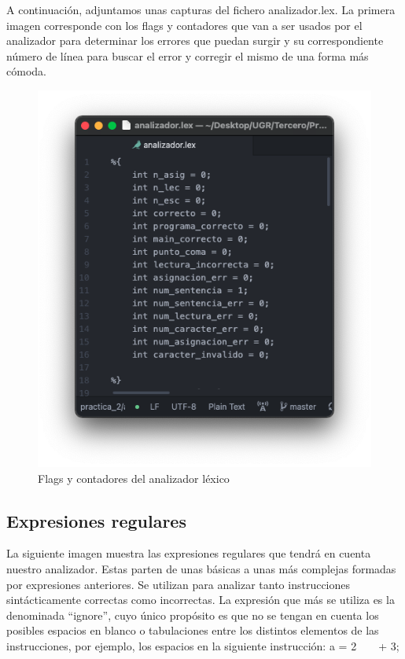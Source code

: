 A continuación, adjuntamos unas capturas del fichero analizador.lex. La primera imagen corresponde con los flags y contadores que van a ser usados por el analizador para determinar los errores que puedan 
surgir y su correspondiente número de línea para buscar el error y corregir el mismo de una forma más cómoda. 

\begin{figure}[H] 
	\centering
	\includegraphics[scale=0.5]{../practica_2/images/variables.png} 
	\caption{Flags y contadores del analizador léxico} 
    \label{fig:variables}
\end{figure}

\subsection{Expresiones regulares}

La siguiente imagen muestra las expresiones regulares que tendrá en cuenta nuestro analizador. Estas parten de unas básicas a unas más complejas formadas por expresiones anteriores. Se utilizan
para analizar tanto instrucciones sintácticamente correctas como incorrectas. La expresión que más se utiliza es la denominada ``ignore'', cuyo único propósito es que no se tengan en cuenta
los posibles espacios en blanco o tabulaciones entre los distintos elementos de las instrucciones, por ejemplo, los espacios en la siguiente instrucción: a = 2\ \ \ \ + 3;

